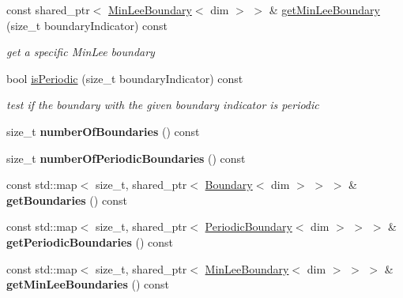 \begin{DoxyCompactItemize}
const shared\_\-ptr$<$ \hyperlink{classnatrium_1_1MinLeeBoundary}{MinLeeBoundary}$<$ dim $>$ $>$ \& \hyperlink{classnatrium_1_1BoundaryCollection_aea35fe9645fc3521da83ae83ef84967b}{getMinLeeBoundary} (size\_\-t boundaryIndicator) const 
\begin{DoxyCompactList}\small\item\em get a specific MinLee boundary \item\end{DoxyCompactList}\item 
\hypertarget{classnatrium_1_1BoundaryCollection_aec4a9de4aaccaa7a49e5308bf9812c66}{
bool \hyperlink{classnatrium_1_1BoundaryCollection_aec4a9de4aaccaa7a49e5308bf9812c66}{isPeriodic} (size\_\-t boundaryIndicator) const }
\label{classnatrium_1_1BoundaryCollection_aec4a9de4aaccaa7a49e5308bf9812c66}

\begin{DoxyCompactList}\small\item\em test if the boundary with the given boundary indicator is periodic \item\end{DoxyCompactList}\item 
\hypertarget{classnatrium_1_1BoundaryCollection_ad9dbba7ffccaa31ee79cace73197148e}{
size\_\-t {\bfseries numberOfBoundaries} () const }
\label{classnatrium_1_1BoundaryCollection_ad9dbba7ffccaa31ee79cace73197148e}

\item 
\hypertarget{classnatrium_1_1BoundaryCollection_a62004be7508761795d894ed7ca7e4eb8}{
size\_\-t {\bfseries numberOfPeriodicBoundaries} () const }
\label{classnatrium_1_1BoundaryCollection_a62004be7508761795d894ed7ca7e4eb8}

\item 
\hypertarget{classnatrium_1_1BoundaryCollection_ab1454365bef1b79a2bd38148f8037be6}{
const std::map$<$ size\_\-t, shared\_\-ptr$<$ \hyperlink{classnatrium_1_1Boundary}{Boundary}$<$ dim $>$ $>$ $>$ \& {\bfseries getBoundaries} () const }
\label{classnatrium_1_1BoundaryCollection_ab1454365bef1b79a2bd38148f8037be6}

\item 
\hypertarget{classnatrium_1_1BoundaryCollection_a3f72a07f410649d80f3077046521b551}{
const std::map$<$ size\_\-t, shared\_\-ptr$<$ \hyperlink{classnatrium_1_1PeriodicBoundary}{PeriodicBoundary}$<$ dim $>$ $>$ $>$ \& {\bfseries getPeriodicBoundaries} () const }
\label{classnatrium_1_1BoundaryCollection_a3f72a07f410649d80f3077046521b551}

\item 
\hypertarget{classnatrium_1_1BoundaryCollection_a9a56438d4dfcfafe5842882fe34bbe0e}{
const std::map$<$ size\_\-t, shared\_\-ptr$<$ \hyperlink{classnatrium_1_1MinLeeBoundary}{MinLeeBoundary}$<$ dim $>$ $>$ $>$ \& {\bfseries getMinLeeBoundaries} () const }
\label{classnatrium_1_1BoundaryCollection_a9a56438d4dfcfafe5842882fe34bbe0e}

\end{DoxyCompactItemize}


